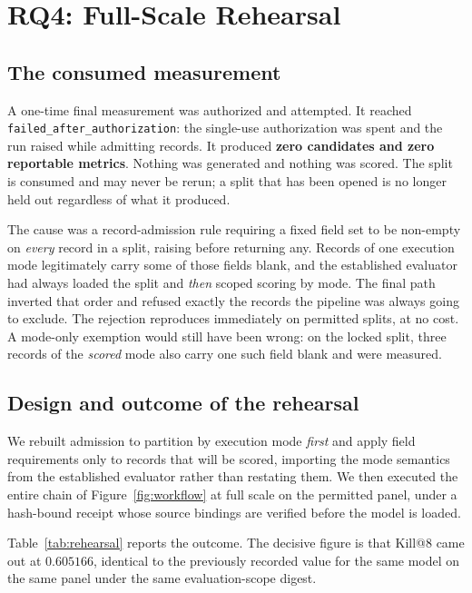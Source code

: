 \documentclass[10pt,conference,letterpaper]{IEEEtran}
\makeatletter
\newcommand{\killk}[1]{Kill@#1}
\makeatother
\begin{document}
\section{RQ4: Full-Scale Rehearsal}
\label{sec:rq4}

\subsection{The consumed measurement}

A one-time final measurement was authorized and attempted. It reached
\texttt{failed\_after\_authorization}: the single-use authorization was spent and
the run raised while admitting records. It produced \textbf{zero candidates and
zero reportable metrics}. Nothing was generated and nothing was scored. The
split is consumed and may never be rerun; a split that has been opened is no
longer held out regardless of what it produced.

The cause was a record-admission rule requiring a fixed field set to be
non-empty on \emph{every} record in a split, raising before returning any.
Records of one execution mode legitimately carry some of those fields blank, and
the established evaluator had always loaded the split and \emph{then} scoped
scoring by mode. The final path inverted that order and refused exactly the
records the pipeline was always going to exclude. The rejection reproduces
immediately on permitted splits, at no cost. A mode-only exemption would still
have been wrong: on the locked split, three records of the \emph{scored} mode
also carry one such field blank and were measured.

\subsection{Design and outcome of the rehearsal}

We rebuilt admission to partition by execution mode \emph{first} and apply field
requirements only to records that will be scored, importing the mode semantics
from the established evaluator rather than restating them. We then executed the
entire chain of Figure~\ref{fig:workflow} at full scale on the permitted panel,
under a hash-bound receipt whose source bindings are verified before the model is
loaded.

Table~\ref{tab:rehearsal} reports the outcome. The decisive figure is that
\killk{8} came out at $0.605166$, identical to the previously recorded value for
the same model on the same panel under the same evaluation-scope digest.
\end{document}
